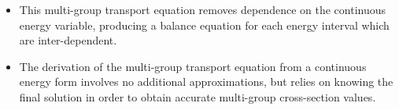 
\newpage
\vfill
\begin{highlightsbox}[frametitle=Highlights]
	\begin{itemize}
		\item This multi-group transport equation removes dependence on the continuous energy variable, producing a balance equation for each energy interval which are inter-dependent.
		\item The derivation of the multi-group transport equation from a continuous energy form involves no additional approximations, but relies on knowing the final solution in order to obtain accurate multi-group cross-section values.
	\end{itemize}
\end{highlightsbox}
\vfill